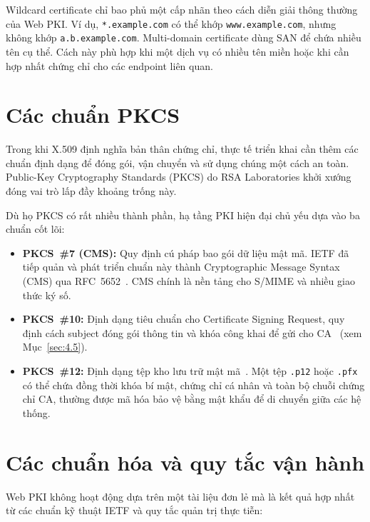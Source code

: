 Wildcard certificate chỉ bao phủ một cấp nhãn theo cách diễn giải
thông thường của Web PKI. Ví dụ, \texttt{*.example.com} có thể
khớp \texttt{www.example.com}, nhưng không khớp
\texttt{a.b.example.com}. Multi-domain certificate dùng SAN để
chứa nhiều tên cụ thể. Cách này phù hợp khi một dịch vụ có nhiều
tên miền hoặc khi cần hợp nhất chứng chỉ cho các endpoint liên
quan.

\section{Các chuẩn PKCS}
\label{sec:4.7}

Trong khi X.509 định nghĩa bản thân chứng chỉ, thực tế triển khai cần thêm các chuẩn định dạng để đóng gói, vận chuyển và sử dụng chúng một cách an toàn. Public-Key Cryptography Standards (PKCS) do RSA Laboratories khởi xướng đóng vai trò lấp đầy khoảng trống này. 

Dù họ PKCS có rất nhiều thành phần, hạ tầng PKI hiện đại chủ yếu dựa vào ba chuẩn cốt lõi:
\begin{itemize}
    \item \textbf{PKCS~\#7 (CMS):} Quy định cú pháp bao gói dữ liệu mật mã. IETF đã tiếp quản và phát triển chuẩn này thành Cryptographic Message Syntax (CMS) qua RFC~5652~\cite{RFC5652}. CMS chính là nền tảng cho S/MIME và nhiều giao thức ký số.
    \item \textbf{PKCS~\#10:} Định dạng tiêu chuẩn cho Certificate Signing Request, quy định cách subject đóng gói thông tin và khóa công khai để gửi cho CA~\cite{RFC2986} (xem Mục~\ref{sec:4.5}).
    \item \textbf{PKCS~\#12:} Định dạng tệp kho lưu trữ mật mã~\cite{RFC7292}. Một tệp \texttt{.p12} hoặc \texttt{.pfx} có thể chứa đồng thời khóa bí mật, chứng chỉ cá nhân và toàn bộ chuỗi chứng chỉ CA, thường được mã hóa bảo vệ bằng mật khẩu để di chuyển giữa các hệ thống.
\end{itemize}

\section{Các chuẩn hóa và quy tắc vận hành}
\label{sec:4.8}

Web PKI không hoạt động dựa trên một tài liệu đơn lẻ mà là kết quả hợp nhất từ các chuẩn kỹ thuật IETF và quy tắc quản trị thực tiễn:

